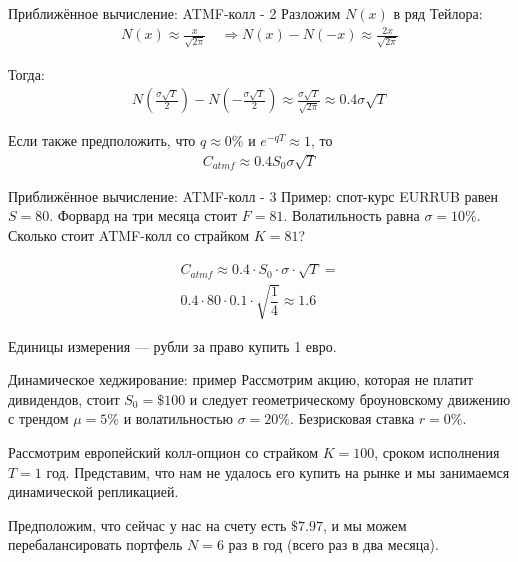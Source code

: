 \documentclass{beamer}
\begin{document}
\begin{frame}{Приближённое вычисление: ATMF-колл - 2}
\justify
Разложим $N(x)$ в ряд Тейлора:
\begin{align*}
N(x) \approx \frac{x}{\sqrt{2\pi}} \quad \Rightarrow
N(x) - N(-x) \approx \frac{2x}{\sqrt{2\pi}}
\end{align*}

Тогда:
\begin{align*}
N\left(\frac{\sigma \sqrt{T}}{2}\right) - N\left(-\frac{\sigma \sqrt{T}}{2}\right)
\approx
\frac{\sigma\sqrt{T}}{\sqrt{2\pi}}
\approx
0.4\sigma\sqrt{T}
\end{align*}

Если также предположить, что $q\approx 0\%$ и $e^{-qT} \approx 1$, то
\begin{align*}
C_{atmf} \approx 0.4 S_0 \sigma \sqrt{T}
\end{align*}
\end{frame}



\begin{frame}{Приближённое вычисление: ATMF-колл - 3}
\justify
Пример: спот-курс EURRUB равен $S=80$. Форвард на три месяца стоит $F=81$. Волатильность равна $\sigma=10\%$. Сколько стоит ATMF-колл со страйком $K=81$?

\begin{align*}
C_{atmf} \approx 0.4 \cdot S_0 \cdot \sigma \cdot \sqrt{T} = \\
0.4 \cdot 80 \cdot 0.1 \cdot \sqrt{\dfrac{1}{4}} \approx 1.6
\end{align*}

Единицы измерения --- рубли за право купить 1 евро.
\end{frame}



\begin{frame}{Динамическое хеджирование: пример}
\justify
Рассмотрим акцию, которая не платит дивидендов, стоит $S_0=\$100$ и следует 
геометрическому броуновскому движению с трендом $\mu=5\%$ и волатильностью
$\sigma=20\%$. Безрисковая ставка $r=0\%$.

\justify
Рассмотрим европейский колл-опцион со страйком $K=100$, сроком исполнения $T=1$ год. 
Представим, что нам не удалось его купить на рынке и мы занимаемся динамической 
репликацией.

\justify
Предположим, что сейчас у нас на счету есть $\$7.97$, и мы можем перебалансировать портфель $N=6$ раз в год (всего раз в два месяца).
\end{frame}
\end{document}
